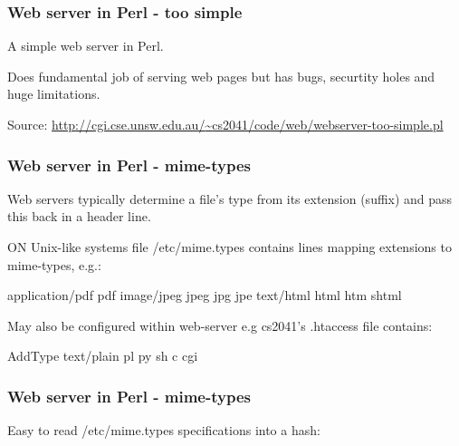 \begin{frame}[fragile]
\frametitle{Web server in Perl - too simple}
A simple web server in Perl.

Does fundamental job of serving web pages but
has  bugs, securtity holes and huge limitations.


{\tiny Source:  \href{http://cgi.cse.unsw.edu.au/~cs2041/code/web/webserver-too-simple.pl}{http://cgi.cse.unsw.edu.au/{\textasciitilde}cs2041/code/web/webserver-too-simple.pl}}
\end{frame}

\begin{frame}[fragile]
\frametitle{Web server in Perl - mime-types}
Web servers typically determine a file's type from its extension (suffix)
and pass this back in a header line.

ON Unix-like systems  file /etc/mime.types contains lines mapping extensions to
mime-types, e.g.:

\begin{txt}
    application/pdf             pdf
    image/jpeg                  jpeg jpg jpe
    text/html                   html htm shtml
\end{txt}

May also be configured within web-server e.g cs2041's .htaccess file contains:

\begin{txt}
AddType text/plain pl py sh c cgi
\end{txt}

\end{frame}

\begin{frame}[fragile]
\frametitle{Web server in Perl - mime-types}

Easy to read /etc/mime.types specifications into a hash:

\end{frame}

